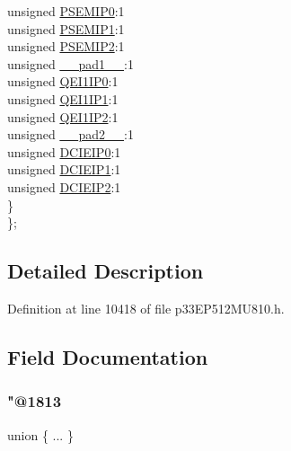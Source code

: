 \begin{DoxyCompactItemize}
\begin{tabbing}
\>\>unsigned \hyperlink{structtag_i_p_c14_b_i_t_s_a71fb126fd3beb44e0f912fcbda3ce852}{PSEMIP0}:1\\
\>\>unsigned \hyperlink{structtag_i_p_c14_b_i_t_s_a9c32324460b5968d6d81bdba87f38840}{PSEMIP1}:1\\
\>\>unsigned \hyperlink{structtag_i_p_c14_b_i_t_s_a3ec927c2d59b698bd413f851f863d86b}{PSEMIP2}:1\\
\>\>unsigned \hyperlink{structtag_i_p_c14_b_i_t_s_acaf2d0924a107ec6e8d2e31febaf66f9}{\_\_pad1\_\_}:1\\
\>\>unsigned \hyperlink{structtag_i_p_c14_b_i_t_s_a1c47f3a7227c4b64a6c2221549894427}{QEI1IP0}:1\\
\>\>unsigned \hyperlink{structtag_i_p_c14_b_i_t_s_a741218f408fef23d4586c4f595b698d1}{QEI1IP1}:1\\
\>\>unsigned \hyperlink{structtag_i_p_c14_b_i_t_s_af70f5ccd8c4d9df5b6248b494c885e1a}{QEI1IP2}:1\\
\>\>unsigned \hyperlink{structtag_i_p_c14_b_i_t_s_a4d97cc5f7d51d22fc2bf3eab35c9cb7f}{\_\_pad2\_\_}:1\\
\>\>unsigned \hyperlink{structtag_i_p_c14_b_i_t_s_a653abbd94b4d9a87602cce85f11c3c41}{DCIEIP0}:1\\
\>\>unsigned \hyperlink{structtag_i_p_c14_b_i_t_s_aca8d15c51faed775d997b5c27adc8efd}{DCIEIP1}:1\\
\>\>unsigned \hyperlink{structtag_i_p_c14_b_i_t_s_a2553987525f5161f3482cf706e91f85e}{DCIEIP2}:1\\
\>\} \\
\}; \\

\end{tabbing}\end{DoxyCompactItemize}


\subsection{Detailed Description}


Definition at line 10418 of file p33\+E\+P512\+M\+U810.\+h.



\subsection{Field Documentation}
\mbox{\label{structtag_i_p_c14_b_i_t_s_a074b47f8f9f998442f46612dacc0e28e}} 
\subsubsection{\texorpdfstring{"@1813}{@1813}}
{\footnotesize\ttfamily union \{ ... \} }

